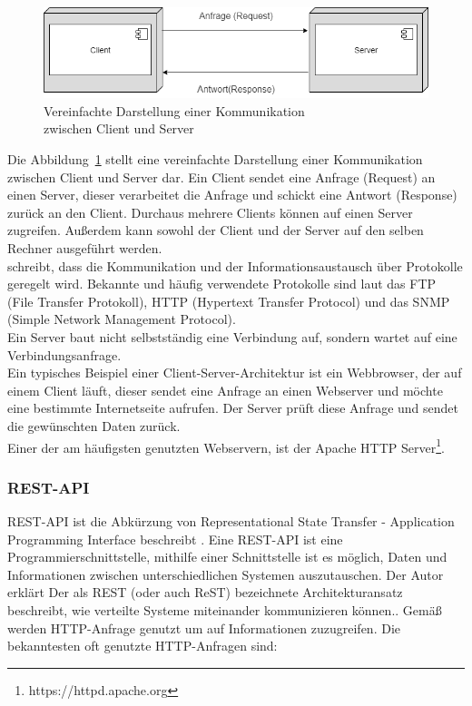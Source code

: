 \begin{figure}[htb]
	\centering
	\includegraphics[width=1\textwidth,angle=0]{abb/Client-Server-Grundlagen}
	\caption[Vereinfachte Darstellung einer Kommunikation zwischen Client und Server]{Vereinfachte Darstellung einer Kommunikation \\ zwischen Client und Server}
	\label{fig:AB_Client-Server-Kommunikation_Grundlagen}
\end{figure}

Die Abbildung~\ref{fig:AB_Client-Server-Kommunikation_Grundlagen} stellt eine vereinfachte Darstellung einer Kommunikation zwischen Client und Server dar. Ein Client sendet eine Anfrage (Request) an einen Server, dieser verarbeitet die Anfrage und schickt eine Antwort (Response) zurück an den Client. Durchaus mehrere Clients können auf einen Server zugreifen. Außerdem kann sowohl der Client und der Server auf den selben Rechner ausgeführt werden.
\\
\cite{clientServerModel} schreibt, dass die Kommunikation und der Informationsaustausch über Protokolle geregelt wird. Bekannte und häufig verwendete Protokolle sind laut \cite{clientServerModel} das \glqq FTP (File Transfer Protokoll), HTTP (Hypertext Transfer Protocol) und das SNMP (Simple Network Management Protocol)\grqq{}.
\\
Ein Server baut nicht selbstständig eine Verbindung auf, sondern wartet auf eine Verbindungsanfrage.
\\
Ein typisches Beispiel einer Client-Server-Architektur ist ein Webbrowser, der auf einem Client läuft, dieser sendet eine Anfrage an einen Webserver und möchte eine bestimmte Internetseite aufrufen. Der Server prüft diese Anfrage und sendet die gewünschten Daten zurück.
\\
Einer der am häufigsten genutzten Webservern, ist der Apache HTTP Server\footnote{https://httpd.apache.org}. 

\subsubsection{REST-API}\label{RestAPI}

REST-API ist die Abkürzung von \glqq Representational State Transfer - Application Programming Interface \grqq{} beschreibt \cite{RESTAPI}.
Eine REST-API ist eine Programmierschnittstelle, mithilfe einer Schnittstelle ist es möglich, Daten und Informationen zwischen unterschiedlichen Systemen auszutauschen.
Der Autor \cite{RESTAPI2} erklärt \glqq Der als REST (oder auch ReST) bezeichnete Architekturansatz beschreibt, wie verteilte Systeme miteinander kommunizieren können.\grqq{}.
Gemäß \cite{RESTAPI} werden HTTP-Anfrage genutzt um auf Informationen zuzugreifen.
Die bekanntesten oft genutzte HTTP-Anfragen sind: \cite{RESTAPI2}

